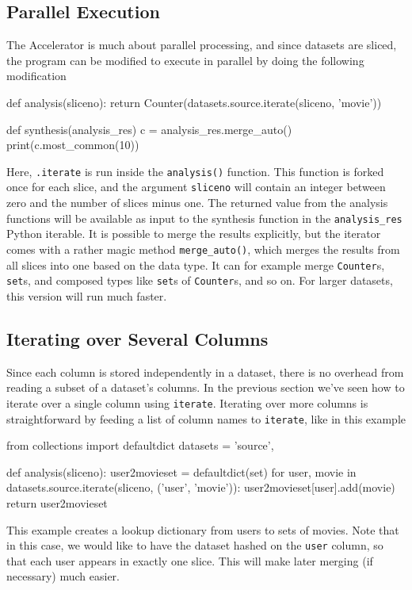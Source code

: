 \subsection{Parallel Execution}
The Accelerator is much about parallel processing, and since datasets
are sliced, the program can be  modified to execute in parallel by
doing the following modification
\begin{python}
def analysis(sliceno):
    return Counter(datasets.source.iterate(sliceno, 'movie'))

def synthesis(analysis_res)
    c = analysis_res.merge_auto()
    print(c.most_common(10))
\end{python}
Here, \texttt{.iterate} is run inside the \texttt{analysis()}
function.  This function is forked once for each slice, and the
argument \texttt{sliceno} will contain an integer between zero and the
number of slices minus one.  The returned value from the analysis
functions will be available as input to the synthesis function in the
\texttt{analysis\_res} Python iterable.  It is possible to merge the
results explicitly, but the iterator comes with a rather magic method
\texttt{merge\_auto()}, which merges the results from all slices into
one based on the data type.  It can for example merge
\texttt{Counter}s, \texttt{set}s, and composed types like
\texttt{set}s of \texttt{Counter}s, and so on.  For larger datasets,
this version will run much faster.



\subsection{Iterating over Several Columns}
Since each column is stored independently in a dataset, there is no
overhead from reading a subset of a dataset's columns.  In the
previous section we've seen how to iterate over a single column using
\texttt{iterate}.  Iterating over more columns is straightforward by
feeding a list of column names to \texttt{iterate}, like in this
example
\begin{python}
from collections import defaultdict
datasets = {'source',}

def analysis(sliceno):
    user2movieset = defaultdict(set)
    for user, movie in datasets.source.iterate(sliceno, ('user', 'movie')):
        user2movieset[user].add(movie)
    return user2movieset
\end{python}
This example creates a lookup dictionary from users to sets of movies.
Note that in this case, we would like to have the dataset hashed on
the \texttt{user} column, so that each user appears in exactly one slice.
This will make later merging (if necessary) much easier.

